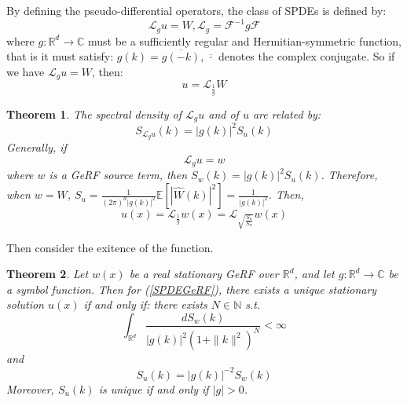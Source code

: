 \documentclass{article}
\newtheorem{theorem}{Theorem}
\begin{document}
By defining the pseudo-differential operators, the class of SPDEs is defined by:
\begin{equation}
	\mathcal{L}_gu = W, \mathcal{L}_g = \mathcal{F}^{-1}g\mathcal{F}
\end{equation}
where $g:\mathbb{R}^d\rightarrow \mathbb{C}$ must be a sufficiently regular and Hermitian-symmetric function, that is it must satisfy: $g(k) = \overline{g(-k)}$, $\overline{\cdot}$ denotes the complex conjugate.
So if we have $\mathcal{L}_gu = W$, then:
\begin{equation}
	u=\mathcal{L}_{\frac{1}{g}}W
\end{equation}

\begin{theorem}
	The spectral density of $\mathcal{L}_gu$ and of $u$ are related by:
	\begin{equation}
		S_{\mathcal{L}_gu}(k) = \left|g(k)\right|^2S_u(k)
	\end{equation}
	Generally, if 
	\begin{equation}\label{SPDEGeRF}
		\mathcal{L}_gu = w
	\end{equation}
	where $w$ is a GeRF source term, then $S_w(k) = \left|g(k)\right|^2S_u(k)$.
	Therefore, when $w = W$, $S_u =\frac{1}{(2\pi)^{d}\left|g(k)\right|^2}\mathbb{E}[|\hat{W}(k)|^2]=\frac{1}{\left|g(k)\right|^2}$. 
  Then, 
\begin{equation}
	u(x) =\mathcal{L}_{\frac{1}{g}}w(x) = \mathcal{L}_{\sqrt{\frac{S_u}{S_w}}}w(x)
\end{equation}
\end{theorem}

Then consider the exitence of the function.
\begin{theorem}
	Let $w(x)$ be a real stationary GeRF over $\mathbb{R}^d$, and let $g:\mathbb{R}^d\rightarrow \mathbb{C}$ be a symbol function. 
	Then for (\ref{SPDEGeRF}), there exists a unique stationary solution $u(x)$ if and only if:
	there exists $N\in \mathbb{N}$ s.t. 
	\begin{equation}
		\int_{\mathbb{R}^d}\frac{dS_w(k)}{\left|g(k)\right|^2(1+\|k\|^2)^N} < \infty
	\end{equation}
	and 
	\begin{equation}
		S_u(k) = \left|g(k)\right|^{-2}S_w(k)
	\end{equation}
	Moreover, $S_u(k)$ is unique if and only if $\left|g\right|>0$.
\end{theorem}

\end{document}
